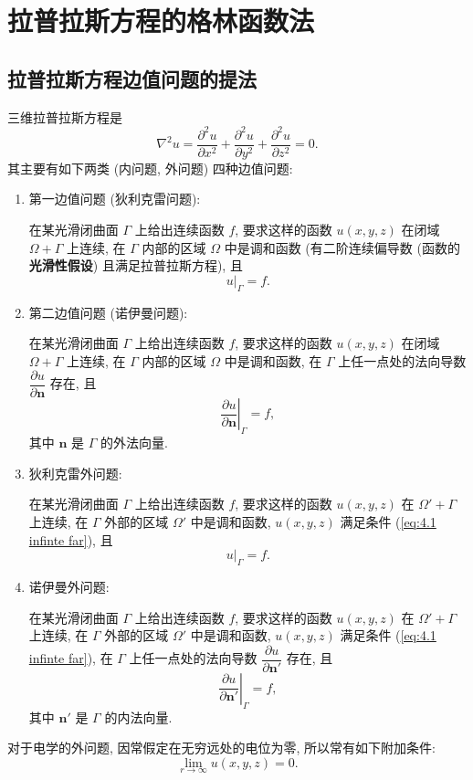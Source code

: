\section{拉普拉斯方程的格林函数法} \label{拉普拉斯方程的格林函数法}
\subsection{拉普拉斯方程边值问题的提法} \label{4 拉普拉斯方程边值问题的提法}
三维拉普拉斯方程是
\begin{equation}
    \nabla^2u=\frac{\partial^2u}{\partial x^2}+\frac{\partial^2u}{\partial y^2}+\frac{\partial^2u}{\partial z^2}=0.
\end{equation}
其主要有如下两类 (内问题, 外问题) 四种边值问题:
\begin{enumerate}[(1)]
    \item 第一边值问题 (狄利克雷问题):

          在某光滑闭曲面 $\Gamma$ 上给出连续函数 $f$, 要求这样的函数 $u(x,y,z)$ 在闭域 $\Omega+\Gamma$ 上连续, 在 $\Gamma$ 内部的区域 $\Omega$ 中是调和函数 (有二阶连续偏导数 (函数的\textbf{光滑性假设}) 且满足拉普拉斯方程), 且
          \begin{equation}
              u|_\Gamma=f.
          \end{equation}
    \item 第二边值问题 (诺伊曼问题):

          在某光滑闭曲面 $\Gamma$ 上给出连续函数 $f$, 要求这样的函数 $u(x,y,z)$ 在闭域 $\Omega+\Gamma$ 上连续, 在 $\Gamma$ 内部的区域 $\Omega$ 中是调和函数, 在 $\Gamma$ 上任一点处的法向导数 $\dfrac{\partial u}{\partial\boldsymbol{n}}$ 存在, 且
          \begin{equation}
              \left.\frac{\partial u}{\partial\boldsymbol{n}}\right|_\Gamma=f,
          \end{equation}
          其中 $\boldsymbol{n}$ 是 $\Gamma$ 的外法向量.
    \item 狄利克雷外问题:

          在某光滑闭曲面 $\Gamma$ 上给出连续函数 $f$, 要求这样的函数 $u(x,y,z)$ 在 $\Omega'+\Gamma$ 上连续, 在 $\Gamma$ 外部的区域 $\Omega'$ 中是调和函数, $u(x,y,z)$ 满足条件 (\ref{eq:4.1 infinte far}), 且
          \begin{equation}
              u|_\Gamma=f.
          \end{equation}
    \item 诺伊曼外问题:

          在某光滑闭曲面 $\Gamma$ 上给出连续函数 $f$, 要求这样的函数 $u(x,y,z)$ 在 $\Omega'+\Gamma$ 上连续, 在 $\Gamma$ 外部的区域 $\Omega'$ 中是调和函数, $u(x,y,z)$ 满足条件 (\ref{eq:4.1 infinte far}), 在 $\Gamma$ 上任一点处的法向导数 $\dfrac{\partial u}{\partial\boldsymbol{n}'}$ 存在, 且
          \begin{equation}
              \left.\frac{\partial u}{\partial\boldsymbol{n}'}\right|_\Gamma=f,
          \end{equation}
          其中 $\boldsymbol{n}'$ 是 $\Gamma$ 的内法向量.
\end{enumerate}

对于电学的外问题, 因常假定在无穷远处的电位为零, 所以常有如下附加条件:
\begin{equation} \label{eq:4.1 infinte far}
    \lim_{r\rightarrow\infty}u(x,y,z)=0.
\end{equation}
